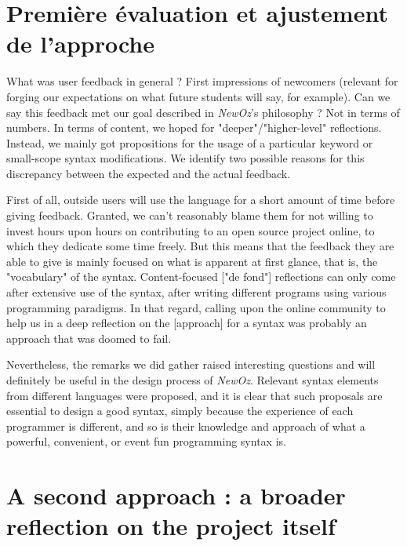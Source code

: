 \section{Première évaluation et ajustement de l'approche}\label{sec:ch4-adjustments}
What was user feedback in general ?
First impressions of newcomers (relevant for forging our expectations on what future students will say, for example).\newline
Can we say this feedback met our goal described in \textit{NewOz}'s philosophy ?
Not in terms of numbers.
In terms of content, we hoped for "deeper"/"higher-level" reflections.
Instead, we mainly got propositions for the usage of a particular keyword or small-scope syntax modifications.\newline
We identify two possible reasons for this discrepancy between the expected and the actual feedback.\newline

First of all, outside users will use the language for a short amount of time before giving feedback.
Granted, we can't reasonably blame them for not willing to invest hours upon hours on contributing to an open source project online, to which they dedicate some time freely.
But this means that the feedback they are able to give is mainly focused on what is apparent at first glance, that is, the "vocabulary" of the syntax.
Content-focused ["de fond"] reflections can only come after extensive use of the syntax, after writing different programs using various programming paradigms.
In that regard, calling upon the online community to help us in a deep reflection on the [approach] for a syntax was probably an approach that was doomed to fail.\newline

Nevertheless, the remarks we did gather raised interesting questions and will definitely be useful in the design process of \textit{NewOz}.
Relevant syntax elements from different languages were proposed, and it is clear that such proposals are essential to design a good syntax, simply because the experience of each programmer is different, and so is their knowledge and approach of what a powerful, convenient, or event fun programming syntax is.

\section{A second approach : a broader reflection on the project itself}\label{sec:ch4-reflection}